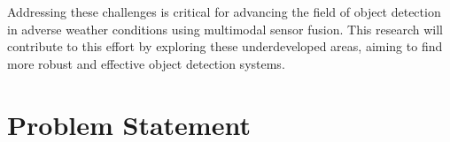 \documentclass[report.tex]{subfiles}
\begin{document}
        Addressing these challenges is critical for advancing the field of object detection in adverse weather conditions using multimodal sensor fusion. This research will contribute to this effort by exploring these underdeveloped areas, aiming to find more robust and effective object detection systems.

    \section{Problem Statement}

        
      
\end{document}
